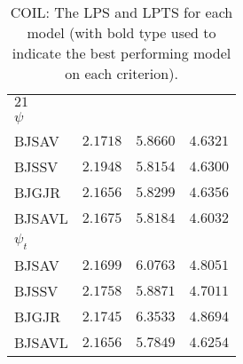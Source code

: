 \documentclass[12pt]{article}
\theoremstyle{plain}
\numberwithin{equation}{section}
\begin{document}
\begin{table}[h!]
\begin{center}
\begin{small}
\begin{tabular}{ l c c c }
{$21$} &{}&{}&{}\\
{$\psi$} \\
 {BJSAV}&     $2.1718$             &     $5.8660$             &     $4.6321$      \\
{BJSSV}&      $ 2.1948$            &     $5.8154$             &     $4.6300$      \\
{BJGJR}&      $2.1656$             &     $5.8299$             &     $4.6356$      \\
{BJSAVL}&    $2.1675$             &     $5.8184$             &     $4.6032$      \\
{$\psi_t$} \\
 {BJSAV}&     $2.1699$             &     $6.0763$             &     $4.8051$      \\
{BJSSV}&     $2.1758$              &     $5.8871$             &     $4.7011$      \\
{BJGJR}&     $2.1745$              &    $6.3533$              &     $4.8694$      \\
{BJSAVL}&   $2.1656$              &     $5.7849$             &     $4.6254$      \\\hline\hline
\end{tabular}
\end{small}
\caption{COIL: The LPS and LPTS for each model (with bold type used to indicate the best performing model on each criterion).}
\label{LPTS_COIL}
\end{center}
\end{table}
\end{document}
